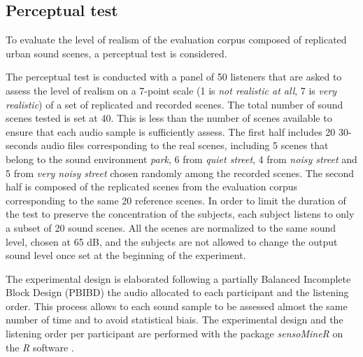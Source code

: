 \documentclass[review,5p,twocolumn,sort&compress,times]{elsarticle}
\begin{document}
\subsection{Perceptual test}

To evaluate the level of realism of the evaluation corpus composed of replicated urban sound scenes, a perceptual test is considered.

The perceptual test is conducted with a panel of 50 listeners that are asked to assess the level of realism on a 7-point scale (1 is \textit{not realistic at all}, 7 is \textit{very realistic}) of a set of replicated and recorded scenes. The total number of sound scenes tested is set at 40. This is less than the number of scenes available to ensure that each audio sample is sufficiently assess. The first half includes 20 30-seconds audio files corresponding to the real scenes, including 5 scenes that belong to the sound environment \textit{park}, 6 from \textit{quiet street}, 4 from \textit{noisy street} and 5 from \textit{very noisy street} chosen randomly among the recorded scenes. The second half is composed of the replicated scenes from the evaluation corpus corresponding to the same 20 reference scenes. In order to limit the duration of the test to preserve the concentration of the subjects, each subject listens to only a subset of 20 sound scenes. All the scenes are normalized to the same sound level, chosen at 65 dB, and the subjects are not allowed to change the output sound level once set at the beginning of the experiment.

The experimental design is elaborated following a partially Balanced Incomplete Block Design (PBIBD) \cite{john1977optimal} the audio allocated to each participant and the listening order. This process allows to each sound sample to be assessed almost the same number of time and to avoid statistical biais. The experimental design and the listening order per participant are performed with the package \textit{sensoMineR} on the \textit{R} software \cite{le_sensominer:_2008}.\\
\end{document}
